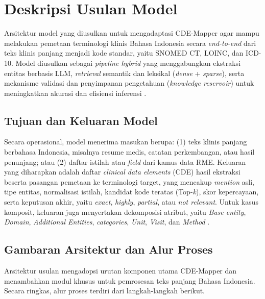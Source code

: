 \section{Deskripsi Usulan Model}

Arsitektur model yang diusulkan untuk mengadaptasi CDE-Mapper agar mampu melakukan pemetaan terminologi klinis Bahasa Indonesia secara \textit{end-to-end} dari teks klinis panjang menjadi kode standar, yaitu SNOMED CT, LOINC, dan ICD-10. Model diusulkan sebagai \textit{pipeline hybrid} yang menggabungkan ekstraksi entitas berbasis LLM, \textit{retrieval} semantik dan leksikal (\textit{dense} + \textit{sparse}), serta mekanisme validasi dan penyimpanan pengetahuan (\textit{knowledge reservoir}) untuk meningkatkan akurasi dan efisiensi inferensi \citep{gilani_cde-mapper_2025}.

\subsection{Tujuan dan Keluaran Model}

Secara operasional, model menerima masukan berupa: (1) teks klinis panjang berbahasa Indonesia, misalnya resume medis, catatan perkembangan, atau hasil penunjang; atau (2) daftar istilah atau \textit{field} dari kamus data RME. Keluaran yang diharapkan adalah daftar \textit{clinical data elements} (CDE) hasil ekstraksi beserta pasangan pemetaan ke terminologi target, yang mencakup \textit{mention} asli, tipe entitas, normalisasi istilah, kandidat kode teratas (Top-\textit{k}), skor kepercayaan, serta keputusan akhir, yaitu \textit{exact}, \textit{highly}, \textit{partial}, atau \textit{not relevant}. Untuk kasus komposit, keluaran juga menyertakan dekomposisi atribut, yaitu \textit{Base entity}, \textit{Domain}, \textit{Additional Entities}, \textit{categories}, \textit{Unit}, \textit{Visit}, dan \textit{Method} \citep{gilani_cde-mapper_2025}.

\subsection{Gambaran Arsitektur dan Alur Proses}

Arsitektur usulan mengadopsi urutan komponen utama CDE-Mapper \citep{gilani_cde-mapper_2025} dan menambahkan modul khusus untuk pemrosesan teks panjang Bahasa Indonesia. Secara ringkas, alur proses terdiri dari langkah-langkah berikut.

